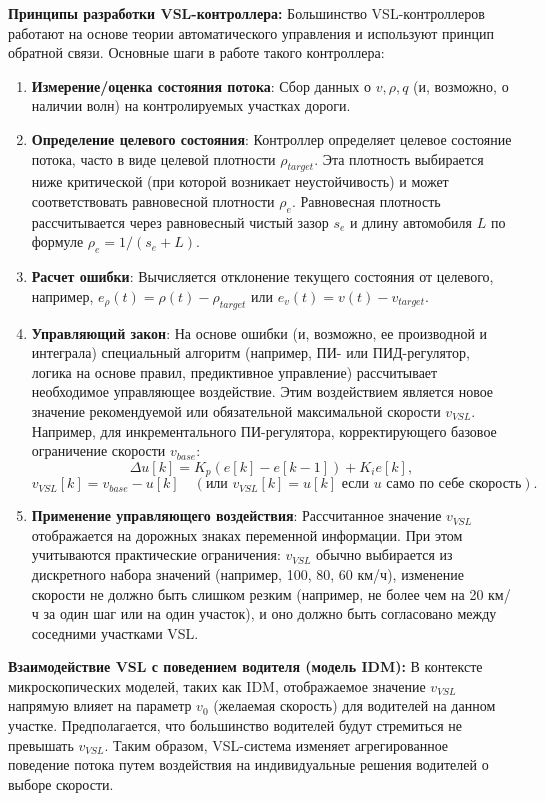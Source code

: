 \documentclass[12pt, a4paper]{article}
\begin{document}
\textbf{Принципы разработки VSL-контроллера:}
Большинство VSL-контроллеров работают на основе теории автоматического управления и используют принцип обратной связи. Основные шаги в работе такого контроллера:
\begin{enumerate}
    \item \textbf{Измерение/оценка состояния потока}: Сбор данных о $v, \rho, q$ (и, возможно, о наличии волн) на контролируемых участках дороги.
    \item \textbf{Определение целевого состояния}: Контроллер определяет целевое состояние потока, часто в виде целевой плотности $\rho_{target}$. Эта плотность выбирается ниже критической (при которой возникает неустойчивость) и может соответствовать равновесной плотности $\rho_e$. Равновесная плотность рассчитывается через равновесный чистый зазор $s_e$ и длину автомобиля $L$ по формуле $\rho_e = 1/(s_e + L)$.
    \item \textbf{Расчет ошибки}: Вычисляется отклонение текущего состояния от целевого, например, $e_\rho(t) = \rho(t) - \rho_{target}$ или $e_v(t) = v(t) - v_{target}$.
    \item \textbf{Управляющий закон}: На основе ошибки (и, возможно, ее производной и интеграла) специальный алгоритм (например, ПИ- или ПИД-регулятор, логика на основе правил, предиктивное управление) рассчитывает необходимое управляющее воздействие. Этим воздействием является новое значение рекомендуемой или обязательной максимальной скорости $v_{VSL}$.
        Например, для инкрементального ПИ-регулятора, корректирующего базовое ограничение скорости $v_{base}$:
        \[ \Delta u[k] = K_p (e[k] - e[k-1]) + K_i e[k], \]
        \[ v_{VSL}[k] = v_{base} - u[k] \quad (\text{или } v_{VSL}[k] = u[k] \text{ если } u \text{ само по себе скорость}). \]
    \item \textbf{Применение управляющего воздействия}: Рассчитанное значение $v_{VSL}$ отображается на дорожных знаках переменной информации. При этом учитываются практические ограничения: $v_{VSL}$ обычно выбирается из дискретного набора значений (например, 100, 80, 60 км/ч), изменение скорости не должно быть слишком резким (например, не более чем на 20 км/ч за один шаг или на один участок), и оно должно быть согласовано между соседними участками VSL.
\end{enumerate}

\textbf{Взаимодействие VSL с поведением водителя (модель IDM):}
В контексте микроскопических моделей, таких как IDM, отображаемое значение $v_{VSL}$ напрямую влияет на параметр $v_0$ (желаемая скорость) для водителей на данном участке. Предполагается, что большинство водителей будут стремиться не превышать $v_{VSL}$. Таким образом, VSL-система изменяет агрегированное поведение потока путем воздействия на индивидуальные решения водителей о выборе скорости.
\end{document}
